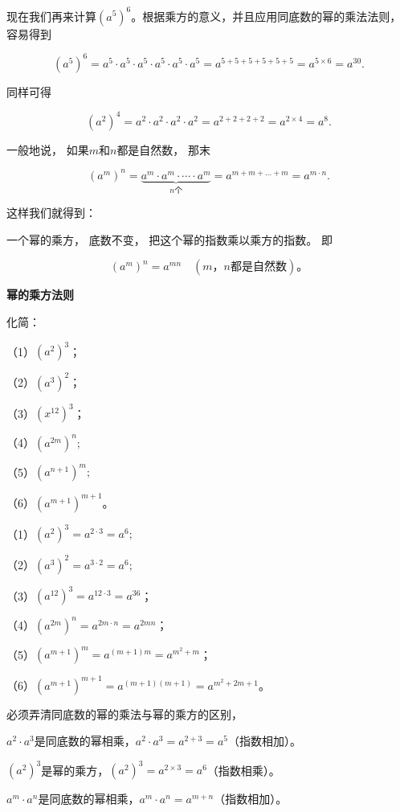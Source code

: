 现在我们再来计算\((a^5)^6\)。根据乘方的意义，并且应用同底数的幂的乘法法则，容易得到

\[
(a ^{5}) ^{6} = a ^{5} \cdot a ^{5} \cdot a ^{5} \cdot a ^{5} \cdot a ^{5} \cdot a ^{5} = a ^{5 + 5 + 5 + 5 + 5 + 5} = a ^{5 \times 6} = a ^{30}.
\]

同样可得

\[
(a ^{2}) ^{4} = a ^{2} \cdot a ^{2} \cdot a ^{2} \cdot a ^{2} = a ^{2 + 2 + 2 + 2} = a ^{2 \times 4} = a ^{8}.
\]

一般地说， 如果\(m\)和\(n\)都是自然数， 那末

\[
(a ^{m}) ^{n} = \underbrace {a ^{m} \cdot a ^{m} \cdot \cdots \cdot a ^{m}} _{n \text{个}} = a ^{m + m + \dots + m} = a ^{m \cdot n}.
\]

这样我们就得到：

一个幂的乘方， 底数不变， 把这个幂的指数乘以乘方的指数。 即

\[
(a ^{m}) ^{n} = a ^{m n} \quad (m\text{，} n \text{都是自然数})\text{。}
\]

\textbf{幂的乘方法则}

 化简：

（1）\((a^{2})^{3}\)；

（2）\((a^3)^2\)；

（3）\((x^{12})^3\)；

（4）\((a^{2m})^n;\)

（5）\((a^{n + 1})^m;\)

（6）\((a^{m + 1})^{m + 1}\)。

 （1）\((a^2)^3 = a^{2\cdot 3} = a^6;\)

（2）\((a^3)^2 = a^{3\cdot 2} = a^6;\)

（3）\((a^{12})^3 = a^{12\cdot 3} = a^{36}\)；

（4）\((a^{2m})^n = a^{2m\cdot n} = a^{2mn}\)；

（5）\((a^{m + 1})^m = a^{(m + 1)m} = a^{m^2 + m}\)；

（6）\((a^{m + 1})^{m + 1} = a^{(m + 1)(m + 1)} = a^{m^2 + 2m + 1}\)。

 必须弄清同底数的幂的乘法与幂的乘方的区别，

\(a^2 \cdot a^3\)是同底数的幂相乘，\(a^2 \cdot a^3 = a^{2+3} = a^5\)（指数相加）。

\((a^{2})^{3}\)是幂的乘方，\((a^{2})^{3}=a^{2\times3}=a^{6}\)（指数相乘）。

\(a^m \cdot a^n\)是同底数的幂相乘，\(a^m \cdot a^n = a^{m+n}\)（指数相加）。

